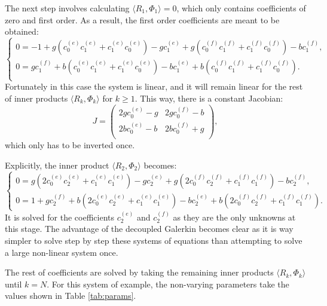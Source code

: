 The next step involves calculating $\langle R_{1}, \Phi_1 \rangle = 0$, which only contains coefficients of zero and first order. As a result, the first order coefficients are meant to be obtained:
\begin{equation}
   \begin{cases}
   0 = -1 + g (c_0^{(e)} c_1^{(e)} + c_1^{(e)}c_0^{(e)}) - g c_1^{(e)} + g(c_0^{(f)} c_1^{(f)} + c_1^{(f)} c_0^{(f)}) - b c_1^{(f)}, \\
   0 = gc_1^{(f)} + b (c_0^{(e)} c_1^{(e)} + c_1^{(e)} c_0^{(e)}) - b c_1^{(e)} + b (c_0^{(f)} c_1^{(f)} + c_1^{(f)} c_0^{(f)}). \\
\end{cases}
\end{equation}
Fortunately in this case the system is linear, and it will remain linear for the rest of inner products $\langle R_k, \Phi_k \rangle$ for $k\geq 1$. This way, there is a constant Jacobian:
\begin{equation}
   J = \begin{pmatrix}
      2gc_0^{(e)} - g & 2gc_0^{(f)} - b \\
      2bc_0^{(e)} - b & 2bc_0^{(f)} + g \\
   \end{pmatrix},
\end{equation}
which only has to be inverted once. 

Explicitly, the inner product $\langle R_2, \Phi_2 \rangle$ becomes:
\begin{equation}
   \begin{cases}
      0 = g(2c_0^{(e)}c_2^{(e)} + c_1^{(e)}c_1^{(e)}) - g c_2^{(e)} + g(2c_0^{(f)}c_2^{(f)} + c_1^{(f)}c_1^{(f)}) - bc_2^{(f)}, \\
      0 = 1 + gc_2^{(f)} + b(2c_0^{(e)}c_2^{(e)} + c_1^{(e)}c_1^{(e)}) - bc_2^{(e)} + b(2c_0^{(f)}c_2^{(f)} + c_1^{(f)}c_1^{(f)}).
   \end{cases}
\end{equation}
It is solved for the coefficients $c_2^{(e)}$ and $c_2^{(f)}$ as they are the only unknowns at this stage. The advantage of the decoupled Galerkin becomes clear as it is way simpler to solve step by step these systems of equations than attempting to solve a large non-linear system once.

The rest of coefficients are solved by taking the remaining inner products $\langle R_k, \Phi_k \rangle$ until $k=N$. For this system of example, the non-varying parameters take the values shown in Table \ref{tab:params}.

